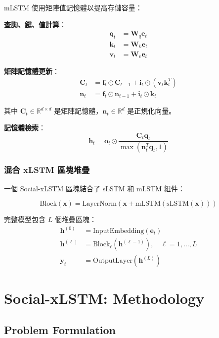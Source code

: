 \documentclass[11pt,a4paper]{article}
\begin{document}
mLSTM 使用矩陣值記憶體以提高存儲容量：

\textbf{查詢、鍵、值計算}：
\begin{align}
\mathbf{q}_t &= \mathbf{W}_q \mathbf{e}_t \\
\mathbf{k}_t &= \mathbf{W}_k \mathbf{e}_t \\
\mathbf{v}_t &= \mathbf{W}_v \mathbf{e}_t
\end{align}

\textbf{矩陣記憶體更新}：
\begin{align}
\mathbf{C}_t &= \mathbf{f}_t \odot \mathbf{C}_{t-1} + \mathbf{i}_t \odot (\mathbf{v}_t \mathbf{k}_t^T) \\
\mathbf{n}_t &= \mathbf{f}_t \odot \mathbf{n}_{t-1} + \mathbf{i}_t \odot \mathbf{k}_t
\end{align}

其中 $\mathbf{C}_t \in \mathbb{R}^{d \times d}$ 是矩陣記憶體，$\mathbf{n}_t \in \mathbb{R}^d$ 是正規化向量。

\textbf{記憶體檢索}：
\begin{equation}
\mathbf{h}_t = \mathbf{o}_t \odot \frac{\mathbf{C}_t \mathbf{q}_t}{\max(\mathbf{n}_t^T \mathbf{q}_t, 1)}
\end{equation}

\subsubsection{混合 xLSTM 區塊堆疊}

一個 Social-xLSTM 區塊結合了 sLSTM 和 mLSTM 組件：

\begin{equation}
\text{Block}(\mathbf{x}) = \text{LayerNorm}(\mathbf{x} + \text{mLSTM}(\text{sLSTM}(\mathbf{x})))
\end{equation}

完整模型包含 $L$ 個堆疊區塊：
\begin{align}
\mathbf{h}^{(0)} &= \text{InputEmbedding}(\mathbf{e}_t) \\
\mathbf{h}^{(\ell)} &= \text{Block}_\ell(\mathbf{h}^{(\ell-1)}), \quad \ell = 1, \ldots, L \\
\mathbf{y}_t &= \text{OutputLayer}(\mathbf{h}^{(L)})
\end{align}

\section{Social-xLSTM: Methodology}

\subsection{Problem Formulation}
\end{document}
